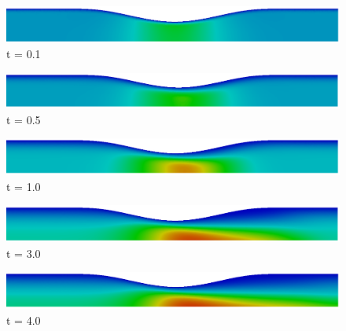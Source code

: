 \vspace{2cm} 
\begin{figure}[H]
     \begin{minipage}{.50\linewidth}
      \centering
      \includegraphics[scale=0.175]{./02_chaps/cap_solution/figure/vel_Curved200.png}\\
      t = 0.1
     \end{minipage}%
     \begin{minipage}{.50\linewidth}
      \centering
      \includegraphics[scale=0.172]{./02_chaps/cap_solution/figure/vel_Curved1000.png}\\
      t = 0.5
     \end{minipage}
     \begin{minipage}{.50\linewidth}
     \medskip
      \centering
      \includegraphics[scale=0.175]{./02_chaps/cap_solution/figure/vel_Curved2000.png}\\
      t = 1.0
     \end{minipage}%
     \begin{minipage}{.50\linewidth}
     \medskip
      \centering
      \includegraphics[scale=0.175]{./02_chaps/cap_solution/figure/vel_Curved6000.png}\\
      t = 3.0
     \end{minipage}
     \begin{minipage}{.50\linewidth}
      \centering
      \includegraphics[scale=0.175]{./02_chaps/cap_solution/figure/vel_Curved8000.png}\\
      t = 4.0
     \end{minipage}%

\end{figure}
